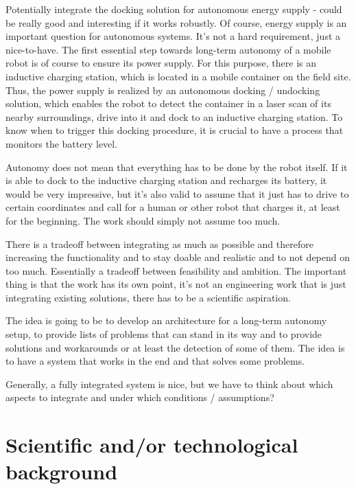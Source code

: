 \documentclass[german, master, expose, latin1]{base/thesis_KBS}
\begin{document}
Potentially integrate the docking solution for autonomous energy supply - could be really good and interesting if it works robustly.
Of course, energy supply is an important question for autonomous systems. It's not a hard requirement, just a nice-to-have.
The first essential step towards long-term autonomy of a mobile robot is of course to ensure its power supply.
For this purpose, there is an inductive charging station, which is located in a mobile container on the field site.
Thus, the power supply is realized by an autonomous docking / undocking solution, which enables the robot to detect the container in a laser scan
of its nearby surroundings, drive into it and dock to an inductive charging station.
To know when to trigger this docking procedure, it is crucial to have a process that monitors the battery level.\newline

Autonomy does not mean that everything has to be done by the robot itself. If it is able to dock to the inductive charging station and recharges its battery,
it would be very impressive, but it's also valid to assume that it just has to drive to certain coordinates and call for a human or other robot that charges it,
at least for the beginning. The work should simply not assume too much.\newline

There is a tradeoff between integrating as much as possible and therefore increasing the functionality and to stay doable and realistic and to not depend on too much.\newline
Essentially a tradeoff between feasibility and ambition. The important thing is that the work has its own point, it's not an engineering work that is just 
integrating existing solutions, there has to be a scientific aspiration.\newline

The idea is going to be to develop an architecture for a long-term autonomy setup, to provide lists of problems that can stand in its way and to provide solutions
and workarounds or at least the detection of some of them. The idea is to have a system that works in the end and that solves some problems.\newline

Generally, a fully integrated system is nice, but we have to think about which aspects to integrate and under which conditions / assumptions?

\section{Scientific and/or technological background}
\end{document}
